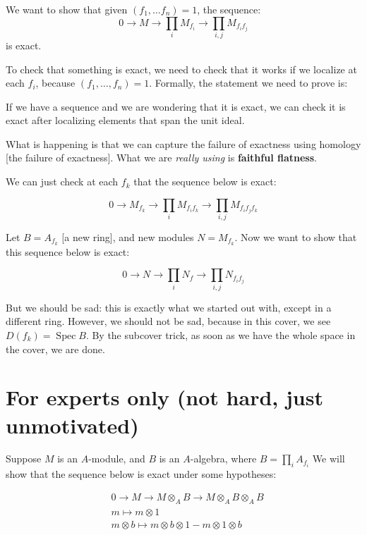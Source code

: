 \documentclass{book}
\newcommand{\spec}{\operatorname{Spec}}
\theoremstyle{definition}
\begin{document}
We want to show that given $(f_1, \dots f_n) = 1$, the sequence:
$$
0 \rightarrow M \rightarrow \prod_i M_{f_i} \rightarrow \prod_{i, j} M_{f_i f_j}
$$
is exact.

To check that something is exact, we need to check that it works if we localize
at each $f_i$, because $(f_1, \dots, f_n) = 1$. Formally, the statement
we need to prove is:
\begin{lemma} If we have a sequence and we are wondering that it is exact,
we can check it is exact after localizing elements that span the unit ideal.
\end{lemma}

What is happening is that we can capture the failure of exactness using
homology [the failure of exactness]. What we are \emph{really using}
is \textbf{faithful flatness}.


We can just check at each $f_k$ that the sequence below is exact:

$$
0 \rightarrow M_{f_k} \rightarrow \prod_i M_{f_i f_k} \rightarrow \prod_{i, j} M_{f_i f_j f_k}
$$

Let $B = A_{f_k}$ [a new ring], and new modules $N = M_{f_k}$. Now we want
to show that this sequence below is exact:

$$
0 \rightarrow N \rightarrow \prod_i N_f \rightarrow \prod_{i, j} N_{f_i f_j}
$$

But we should be sad: this is exactly what we started out with, except in a different ring.
However, we should not be sad, because in this cover, we see $D(f_k) = \spec B$.
By the subcover trick, as soon as we have the whole space in the cover,
we are done.

\section{For experts only (not hard, just unmotivated)}

Suppose $M$ is an $A$-module, and $B$ is an $A$-algebra, where $B = \prod_i A_{f_i}$
We will show that the sequence below is exact under some hypotheses:

\begin{align*}
&0 \rightarrow M \rightarrow M \otimes_A B \rightarrow M \otimes_A B \otimes_A B  \\
& m \mapsto m \otimes 1  \\
& m \otimes b \mapsto m \otimes b \otimes 1 - m \otimes 1 \otimes b\\
\end{align*}
\end{document}
